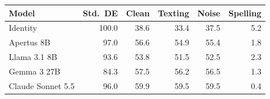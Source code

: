 \begin{tabular}{lrrrrr}
\toprule
Model & Std.\ DE & Clean & Texting & Noise & Spelling \\
\midrule
Identity & 100.0 & 38.6 & 33.4 & 37.5 & 5.2 \\
Apertus 8B & 97.0 & 56.6 & 54.9 & 55.4 & 1.8 \\
Llama 3.1 8B & 93.6 & 53.8 & 51.5 & 52.5 & 2.3 \\
Gemma 3 27B & 84.3 & 57.5 & 56.2 & 56.5 & 1.3 \\
Claude Sonnet 5.5 & 96.0 & 59.9 & 59.5 & 59.5 & 0.4 \\
\bottomrule
\end{tabular}
